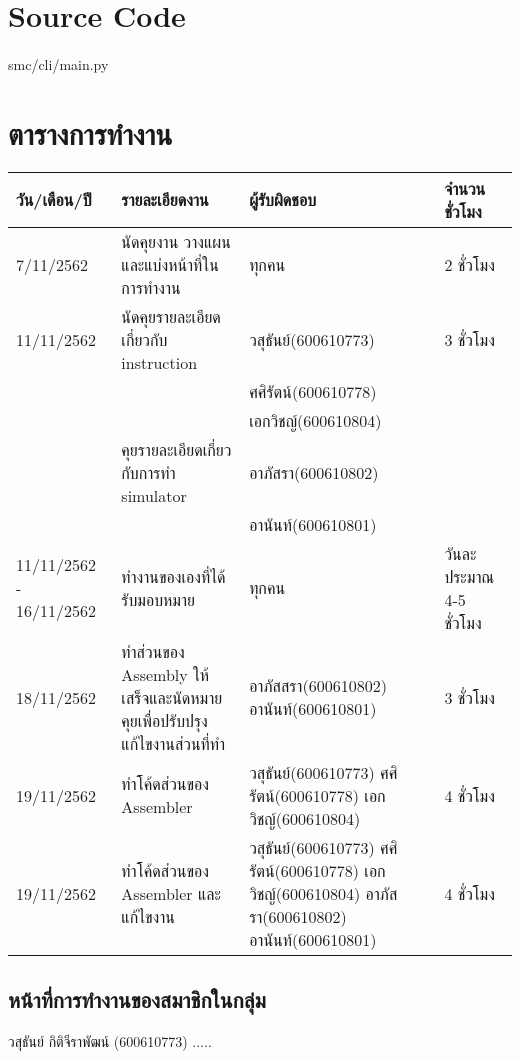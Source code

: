 \documentclass[14pt]{article}
\begin{document}
\vfill

\newpage

\section{Source Code}

\newcommand{\main}{smc/cli/main.py}
\paragraph{}\main


\section{ตารางการทำงาน}

\begin{tabular}{ |p{2cm}|p{6cm}|p{3cm}|p{2cm}|  }
\hline
วัน/เดือน/ปี & รายละเอียดงาน &ผู้รับผิดชอบ & จำนวนชั่วโมง\\
\hline
7/11/2562 & นัดคุยงาน วางแผน และแบ่งหน้าที่ในการทำงาน  & ทุกคน & 2 ชั่วโมง\\
\hline
11/11/2562 & นัดคุยรายละเอียดเกี่ยวกับ instruction  & วสุธันย์(600610773) &3 ชั่วโมง\\ &&ศศิรัตน์(600610778) &\\ &&เอกวิชญ์(600610804) & \\
          & คุยรายละเอียดเกี่ยวกับการทำ simulator & อาภัสรา(600610802)  &\\ && อานันท์(600610801) & \\
\hline
11/11/2562 - 16/11/2562 &ทำงานของเองที่ได้รับมอบหมาย & ทุกคน & วันละประมาณ 4-5 ชั่วโมง\\
\hline
18/11/2562 &ทำส่วนของ Assembly ให้เสร็จและนัดหมายคุยเพื่อปรับปรุงแก้ไขงานส่วนที่ทำ & อาภัสสรา(600610802)        อานันท์(600610801) & 3 ชั่วโมง\\
\hline
19/11/2562 &ทำโค้ดส่วนของ Assembler & วสุธันย์(600610773)    ศศิรัตน์(600610778) เอกวิชญ์(600610804) & 4 ชั่วโมง\\
\hline
19/11/2562 &ทำโค้ดส่วนของ Assembler และแก้ไขงาน  & วสุธันย์(600610773)    ศศิรัตน์(600610778) เอกวิชญ์(600610804)  อาภัสรา(600610802) อานันท์(600610801) & 4 ชั่วโมง\\
\hline
\end{tabular}
\subsection{หน้าที่การทำงานของสมาชิกในกลุ่ม}
วสุธันย์ กิติจีราพัฒน์ (600610773) ..... 
\end{document}
